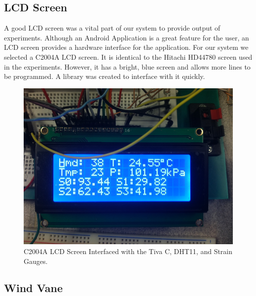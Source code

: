 		
		\subsection{LCD Screen}
		
		A good LCD screen was a vital part of our system to provide output of experiments. Although an Android Application is a great feature for the user, an LCD screen provides a hardware interface for the application. For our system we selected a C2004A LCD screen. 
		It is identical to the Hitachi HD44780 screen used in the experiments. However, it has a bright, blue screen and allows more lines to be programmed. A library was created to interface with it quickly.
		
		\begin{figure}[H]
			\centering
				\includegraphics[scale=0.35]{img/LCD}
			\caption{C2004A LCD Screen Interfaced with the Tiva C, DHT11, and Strain Gauges.}
		\end{figure}
		
		
		
		\subsection{Wind Vane}
		
